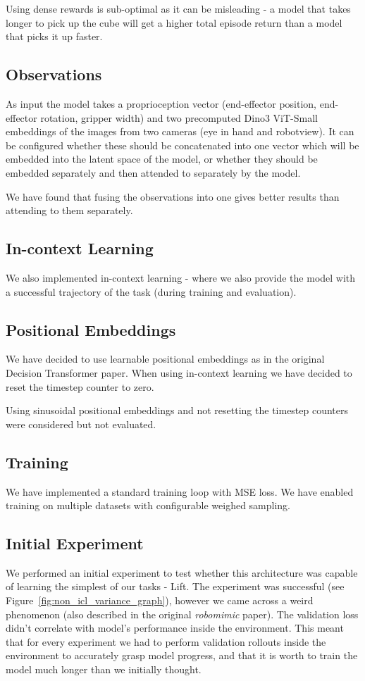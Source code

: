 \documentclass{article}
\begin{document}
Using dense rewards is sub-optimal as it can be misleading - a model that takes longer to pick up the cube will get a higher total episode return than a model that picks it up faster.

\subsection{Observations}
As input the model takes a proprioception vector (end-effector position, end-effector rotation, gripper width) and two precomputed Dino3 ViT-Small embeddings of the images from two cameras (eye in hand and robotview).
It can be configured whether these should be concatenated into one vector which will be embedded into the latent space of the model, or whether they should be embedded separately and then attended to separately by the model.

We have found that fusing the observations into one gives better results than attending to them separately.

\subsection{In-context Learning}
We also implemented in-context learning - where we also provide the model with a successful trajectory of the task (during training and evaluation).

\subsection{Positional Embeddings}
We have decided to use learnable positional embeddings as in the original Decision Transformer paper. 
When using in-context learning we have decided to reset the timestep counter to zero.

Using sinusoidal positional embeddings and not resetting the timestep counters were considered but not evaluated.

\subsection{Training}
We have implemented a standard training loop with MSE loss. We have enabled training on multiple datasets with configurable weighed sampling. 

\subsection{Initial Experiment}
We performed an initial experiment to test whether this architecture was capable of learning the simplest of our tasks - Lift.
The experiment was successful (see Figure~\ref{fig:non_icl_variance_graph}), however we came across a weird phenomenon (also described in the original \textit{robomimic} paper).
The validation loss didn't correlate with model's performance inside the environment.
This meant that for every experiment we had to perform validation rollouts inside the environment to accurately grasp model progress,
and that it is worth to train the model much longer than we initially thought.
\end{document}
